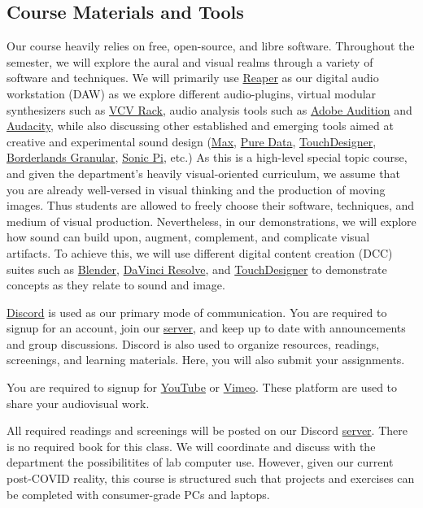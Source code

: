 \subsection{Course Materials and Tools}

Our course heavily relies on free, open-source, and libre software. Throughout the semester, we will explore the aural and visual realms through a variety of software and techniques. We will primarily use \href{https://www.reaper.fm/}{Reaper} as our digital audio workstation (DAW) as we explore different audio-plugins, virtual modular synthesizers such as \href{https://vcvrack.com/Rack}{VCV Rack}, audio analysis tools such as \href{https://www.adobe.com/products/audition.html}{Adobe Audition} and \href{https://www.audacityteam.org/}{Audacity}, while also discussing other established and emerging tools aimed at creative and experimental sound design (\href{https://cycling74.com/products/max}{Max}, \href{https://puredata.info/}{Pure Data}, \href{https://derivative.ca/}{TouchDesigner}, \href{http://www.borderlands-granular.com/app/}{Borderlands Granular}, \href{https://sonic-pi.net/}{Sonic Pi}, etc.) As this is a high-level special topic course, and given the department's heavily visual-oriented curriculum, we assume that you are already well-versed in visual thinking and the production of moving images. Thus students are allowed to freely choose their software, techniques, and medium of visual production. Nevertheless, in our demonstrations, we will explore how sound can build upon, augment, complement, and complicate visual artifacts. To achieve this, we will use different digital content creation (DCC) suites such as \href{http://blender.org/}{Blender}, \href{https://www.blackmagicdesign.com/products/davinciresolve/}{DaVinci Resolve}, and \href{https://derivative.ca/}{TouchDesigner} to demonstrate concepts as they relate to sound and image.


\href{http://discordapp.com/}{Discord} is used as our primary mode of communication. You are required to signup for an account, join our \href{\discordURL}{server}, and keep up to date with announcements and group discussions. Discord is also used to organize resources, readings, screenings, and learning materials. Here, you will also submit your assignments.

You are required to signup for \href{https://www.youtube.com/}{YouTube} or \href{https://vimeo.com/}{Vimeo}. These platform are used to share your audiovisual work.

All required readings and screenings will be posted on our Discord \href{\discordURL}{server}. There is no required book for this class. We will coordinate and discuss with the department the possibilitites of lab computer use. However, given our current post-COVID reality, this course is structured such that projects and exercises can be completed with consumer-grade PCs and laptops.